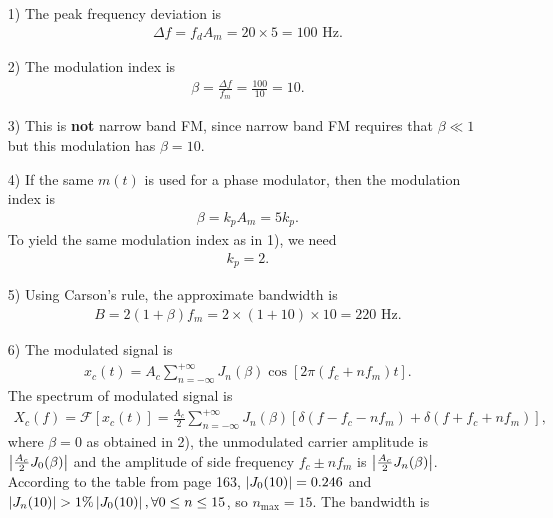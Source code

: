 \documentclass{assignment}
\begin{document}
\begin{sol}
    \begin{itemize}
        \item[1)] The peak frequency deviation is
        \begin{align}
            \Delta f=f_dA_m=20\times 5=100\text{ Hz}.
        \end{align}
        \item[2)] The modulation index is
        \begin{align}
            \beta=\frac{\Delta f}{f_m}=\frac{100}{10}=10.
        \end{align}
        \item[3)] This is \textbf{not} narrow band FM, since narrow band FM requires that $\beta\ll 1$ but this modulation has $\beta=10$.
        \item[4)] If the same $m(t)$ is used for a phase modulator, then the modulation index is
        \begin{align}
            \beta=k_pA_m=5k_p.
        \end{align}
        To yield the same modulation index as in 1), we need
        \begin{align}
            k_p=2.
        \end{align}
        \item[5)] Using Carson's rule, the approximate bandwidth is
        \begin{align}
            B=2(1+\beta)f_m=2\times(1+10)\times 10=220\text{ Hz}.
        \end{align}
        \item[6)] The modulated signal is
        \begin{align}
            x_c(t)=A_c\sum_{n=-\infty}^{+\infty}J_n(\beta)\cos[2\pi(f_c+nf_m)t].
        \end{align}
        The spectrum of modulated signal is
        \begin{align}
            X_c(f)=\mathscr{F}[x_c(t)]=\frac{A_c}{2}\sum_{n=-\infty}^{+\infty}J_n(\beta)\left[\delta(f-f_c-nf_m)+\delta(f+f_c+nf_m)\right],
        \end{align}
        where $\beta=0$ as obtained in 2), the unmodulated carrier amplitude is $\left\lvert\frac{A_c}{2}J_0(\beta)\right\rvert$ and the amplitude of side frequency $f_c\pm nf_m$ is $\left\lvert\frac{A_c}{2}J_n(\beta)\right\rvert$. According to the table from page 163, $\left\lvert J_0(10)\right\rvert=0.246$ and $\left\lvert J_n(10)\right\rvert>1\%\left\lvert J_0(10)\right\rvert,\forall 0\leq n\leq 15$, so $n_{\max}=15$. The bandwidth is
        \begin{align}

\end{align}
\end{itemize}
\end{sol}
\end{document}
